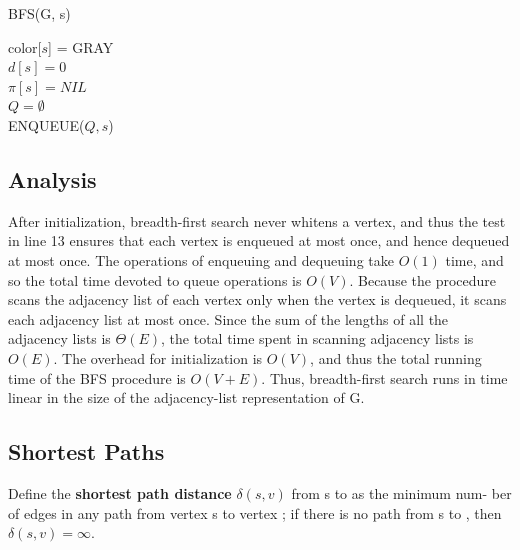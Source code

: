 \begin{algorithm}[H]
    \caption{BFS(G, s)}
    color[$s$] = GRAY \\
    $d[s] = 0$ \\
    $\pi[s] = NIL$ \\
    $Q = \emptyset$ \\
    ENQUEUE($Q, s$) \\
\end{algorithm}

\subsection*{Analysis}

After initialization, breadth-first
search never whitens a vertex, and thus the test in line 13 ensures that each vertex
is enqueued at most once, and hence dequeued at most once. The operations of
enqueuing and dequeuing take $O(1)$ time, and so the total time devoted to queue
operations is $O(V)$. Because the procedure scans the adjacency list of each vertex
only when the vertex is dequeued, it scans each adjacency list at most once. Since
the sum of the lengths of all the adjacency lists is $\Theta(E)$, the total time spent in
scanning adjacency lists is $O(E)$. The overhead for initialization is $O(V)$, and
thus the total running time of the BFS procedure is $O(V + E)$. Thus, breadth-first
search runs in time linear in the size of the adjacency-list representation of G.

\subsection*{Shortest Paths}

Define the \textbf{shortest path distance} $\delta(s,v)$ from s to as the minimum num-
ber of edges in any path from vertex s to vertex ; if there is no path from s to ,
then $\delta(s,v) = \infty$.

